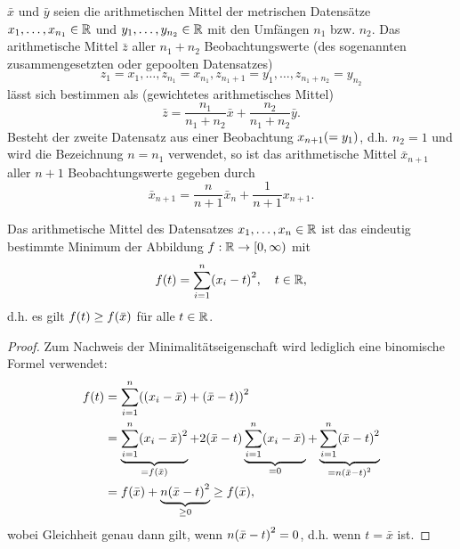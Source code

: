 \documentclass{lecture}
\begin{document}
    \begin{calcrule}
        \(\bar{x}\) und \(\bar{y}\) seien die arithmetischen Mittel der metrischen Datensätze \(x_1, \ldots, x_{n_1} \in \mathbb{R}\) und \(y_1, \ldots, y_{n_2} \in \mathbb{R}\) mit den Umfängen \(n_1\) bzw. \(n_2\).
        Das arithmetische Mittel \(\bar{z}\) aller \(n_1 + n_2\) Beobachtungswerte (des sogenannten zusammengesetzten oder gepoolten Datensatzes)
        \[
            z_1 = x_1, \ldots, z_{n_1} = x_{n_1}, z_{n_1 + 1} = y_1, \ldots, z_{n_1 + n_2} = y_{n_2}
        \]
        lässt sich bestimmen als (gewichtetes arithmetisches Mittel)
        \[
            \bar{z} = \frac{n_1}{n_1 + n_2}\bar{x} + \frac{n_2}{n_1 + n_2}\bar{y}.
        \]
        Besteht der zweite Datensatz aus einer Beobachtung \(x_{n + 1}\parentheses*{ = y_1}\), d.h. \(n_2 = 1\) und wird die Bezeichnung \(n = n_1\) verwendet, so ist das arithmetische Mittel \(\bar{x}_{n + 1}\) aller \(n + 1\) Beobachtungswerte gegeben durch
        \[
            \bar{x}_{n + 1} = \frac{n}{n + 1}\bar{x}_n + \frac{1}{n + 1}x_{n + 1}.
        \]
    \end{calcrule}

    \begin{calcrule}
        Das arithmetische Mittel des Datensatzes \(x_1, \ldots, x_n \in \mathbb{R}\) ist das eindeutig bestimmte Minimum der Abbildung \(f: \mathbb{R} \to \left[0, \infty\right)\) mit
        \[
            f\parentheses*{t} = \sum_{i = 1}^n \parentheses*{x_i - t}^2, \quad t \in \R,
        \]
        d.h. es gilt \(f\parentheses*{t} \ge f\parentheses*{\bar{x}}\) für alle \(t \in \mathbb{R}\).
    \end{calcrule}

    \begin{proof}
        Zum Nachweis der Minimalitätseigenschaft wird lediglich eine binomische Formel verwendet:
        \begin{align*}
            f\parentheses*{t} &= \sum_{i = 1}^n \parentheses*{\parentheses*{x_i - \bar{x}} + \parentheses*{\bar{x} - t}}^2\\
            &= \underbrace{\sum_{i = 1}^n \parentheses*{x_i - \bar{x}}^2}_{= f\parentheses*{\bar{x}}} + 2\parentheses*{\bar{x} - t}\underbrace{\sum_{i = 1}^n\parentheses*{x_i - \bar{x}}}_{= 0} + \underbrace{\sum_{i = 1}^n \parentheses*{\bar{x} - t}^2}_{= n\parentheses*{\bar{x} - t}^2}\\
            &= f\parentheses*{\bar{x}} + \underbrace{n\parentheses*{\bar{x} - t}^2}_{\ge 0} \ge f\parentheses*{\bar{x}},
        \end{align*}
        wobei Gleichheit genau dann gilt, wenn \(n\parentheses*{\bar{x} - t}^2 = 0\), d.h. wenn \(t = \bar{x}\) ist.
    \end{proof}
\end{document}
